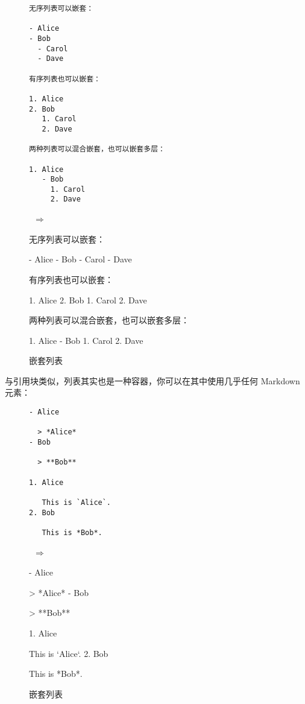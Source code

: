 \documentclass[a4paper,fontset=none]{ctexart}
\begin{document}
\begin{figure}[H]
    \centering
    \begin{minipage}{0.45\textwidth}
        \begin{verbatim}
无序列表可以嵌套：

- Alice
- Bob
  - Carol
  - Dave

有序列表也可以嵌套：

1. Alice
2. Bob
   1. Carol
   2. Dave

两种列表可以混合嵌套，也可以嵌套多层：

1. Alice
   - Bob
     1. Carol
     2. Dave
        \end{verbatim}
    \end{minipage}
    \, $\Longrightarrow$ \,
    \begin{minipage}{0.45\textwidth}
\begin{markdown}
无序列表可以嵌套：

- Alice
- Bob
  - Carol
  - Dave

有序列表也可以嵌套：

1. Alice
2. Bob
   1. Carol
   2. Dave

两种列表可以混合嵌套，也可以嵌套多层：

1. Alice
   - Bob
     1. Carol
     2. Dave
\end{markdown}
    \end{minipage}
    \caption{嵌套列表}
\end{figure}

与引用块类似，列表其实也是一种容器，你可以在其中使用几乎任何 Markdown 元素：

\begin{figure}[H]
    \centering
    \begin{minipage}{0.45\textwidth}
        \begin{verbatim}
- Alice

  > *Alice*
- Bob

  > **Bob**

1. Alice

   This is `Alice`.
2. Bob

   This is *Bob*.
        \end{verbatim}
    \end{minipage}
    \, $\Longrightarrow$ \,
    \begin{minipage}{0.45\textwidth}
\begin{markdown}
- Alice

  > *Alice*
- Bob

  > **Bob**

1. Alice

   This is `Alice`.
2. Bob

   This is *Bob*.
\end{markdown}
    \end{minipage}
    \caption{嵌套列表}
\end{figure}
\end{document}

